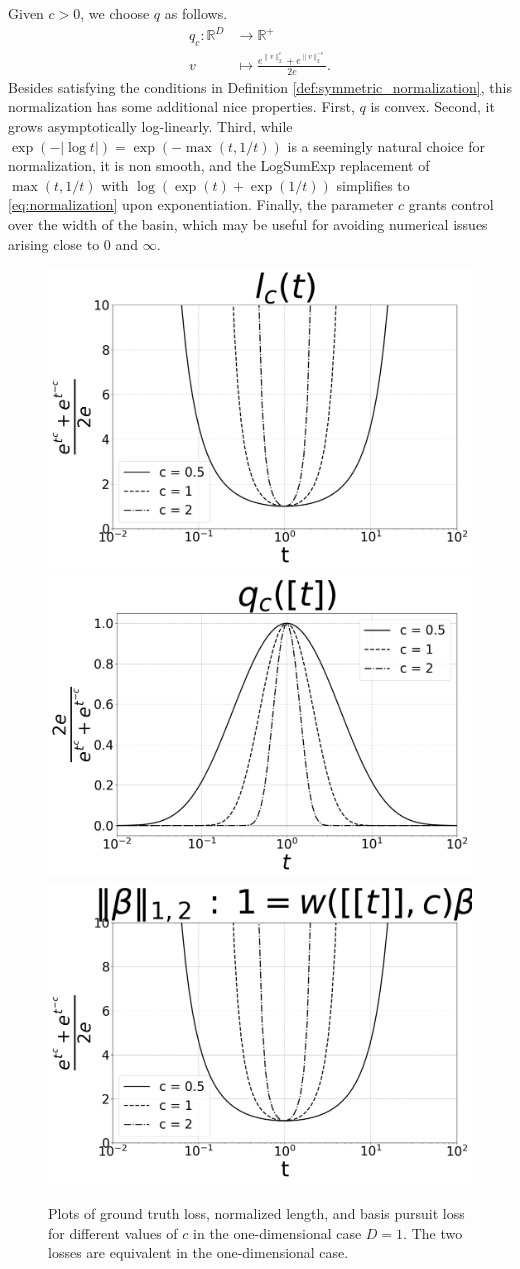 Given $c > 0$, we choose $q$ as follows.
\begin{align}
q_c: \mathbb R^D  &\to \mathbb R^+ \\
v  &\mapsto \frac{e^{\|v\|_2^c} + e^{\|v\|_2^{-c}}}{2e}.
\label{eq:normalization}
\end{align}
Besides satisfying the conditions in Definition \ref{def:symmetric_normalization}, this normalization has some additional nice properties.
First, $q$ is convex.
Second, it grows asymptotically log-linearly.
Third, while $\exp(-|\log t|) = \exp(-\max (t, 1/t))$ is a seemingly natural choice for normalization, it is non smooth, and the LogSumExp \citep{Boyd2004-ql} replacement of $\max (t, 1/t)$ with $ \log (\exp (t ) + \exp(1/t))$ simplifies to \ref{eq:normalization} upon exponentiation.
Finally, the parameter $c$ grants control over the width of the basin, which may be useful for avoiding numerical issues arising close to $0$ and $\infty$.

\begin{figure}
\centering
{}
{\includegraphics[width = .32\textwidth]{../figures/Figure_1a_bw.png}}
\label{fig:gt_loss}
{\includegraphics[width = .32\textwidth]{../figures/Figure_1b_bw.png}}
{\includegraphics[width = .32\textwidth]{../figures/Figure_1c_bw.png}}
\caption{Plots of ground truth loss, normalized length, and basis pursuit loss for different values of $c$ in the one-dimensional case $D = 1$.
The two losses are equivalent in the one-dimensional case.}
\label{fig:losses}
\end{figure}

